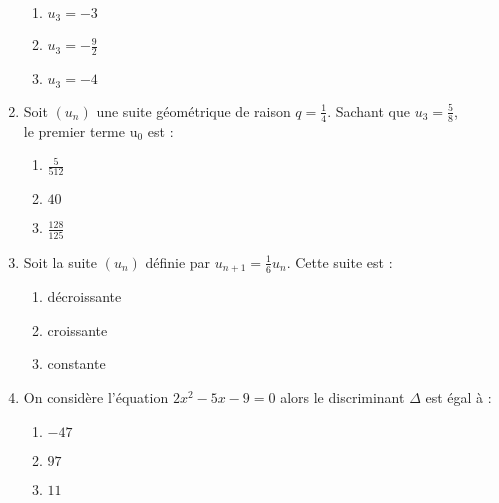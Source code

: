 \documentclass[oneside,twocolumn,landscape]{book}
\begin{document}
\begin{enumerate}
\begin{enumerate}

\item\MauvaiseReponse $u_{3}=-3$

\item\BonneReponse $u_{3}=-\frac{9}{2}$
\item\MauvaiseReponse $u_{3}=-4$


\end{enumerate}



\item Soit $\left(u_{n}\right)$ une suite géométrique de raison $q=\frac{1}{4}$. Sachant que $u_{3}=\frac{5}{8}$,\\ le premier terme $\mathrm{u}_ {0}$ est :

\begin{enumerate}


\item\MauvaiseReponse $\frac{5}{512}$
\item\BonneReponse $40$

\item\MauvaiseReponse $\frac{128}{125}$

\end{enumerate}



\item Soit la suite $\left(u_{n}\right)$ définie par $u_{n+1}=\frac{1}{6}u_n$. Cette suite est :

\begin{enumerate}

\item\BonneReponse décroissante
\item\MauvaiseReponse croissante


\item\MauvaiseReponse constante

\end{enumerate}

\newpage


\item On considère l'équation $2x^{2}-5 x-9=0$ alors le discriminant $\Delta$ est égal à :

\begin{enumerate}


\item\MauvaiseReponse $-47$
\item\BonneReponse $97$

\item\MauvaiseReponse $11$


\end{enumerate}
\end{enumerate}
\end{document}
